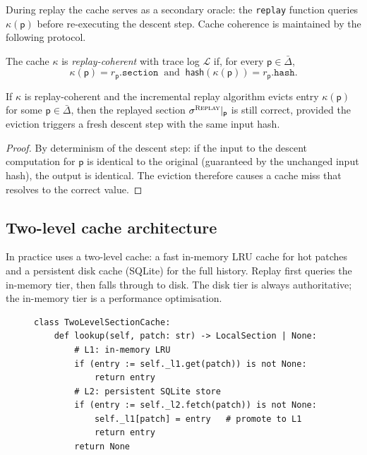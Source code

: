 \documentclass[11pt]{article}
\newcommand{\Replay}{\textsc{Replay}}
\newcommand{\TraceLog}{\mathcal{L}}
\newcommand{\Patch}{\mathsf{p}}
\newcommand{\CacheFn}{\kappa}
\newcommand{\GS}{\sigma}                   %
\newcommand{\HashFn}{\mathsf{hash}}
\newcommand{\UnchangedSet}{\bar\Delta}
\begin{document}
During replay the cache serves as a secondary oracle: the \texttt{replay}
function queries $\CacheFn(\Patch)$ before re-executing the descent step.
Cache coherence is maintained by the following protocol.

\begin{definition}
\label{def:cache-coherence}
The cache $\CacheFn$ is \emph{replay-coherent} with trace log
$\TraceLog$ if, for every $\Patch \in \UnchangedSet$,
\[
  \CacheFn(\Patch) = r_\Patch.\mathtt{section}
  \;\;\text{and}\;\;
  \HashFn(\CacheFn(\Patch)) = r_\Patch.\mathtt{hash}.
\]
\end{definition}

\begin{lemma}
\label{lem:cache-evict}
If $\CacheFn$ is replay-coherent and the incremental replay algorithm
evicts entry $\CacheFn(\Patch)$ for some $\Patch \in \UnchangedSet$,
then the replayed section $\GS^{\Replay}|_\Patch$ is still correct,
provided the eviction triggers a fresh descent step with the same input
hash.
\end{lemma}

\begin{proof}
By determinism of the descent step: if the input to the descent
computation for $\Patch$ is identical to the original (guaranteed by
the unchanged input hash), the output is identical.  The eviction
therefore causes a cache miss that resolves to the correct value.
\end{proof}

\subsection{Two-level cache architecture}

In practice \JuGeo uses a two-level cache: a fast in-memory LRU cache
for hot patches and a persistent disk cache (SQLite) for the full
history.  Replay first queries the in-memory tier, then falls through to
disk.  The disk tier is always authoritative; the in-memory tier is a
performance optimisation.

\begin{figure}[htbp]
\begin{lstlisting}[style=jugeo-python, caption={Two-level cache lookup
  during replay.}]
class TwoLevelSectionCache:
    def lookup(self, patch: str) -> LocalSection | None:
        # L1: in-memory LRU
        if (entry := self._l1.get(patch)) is not None:
            return entry
        # L2: persistent SQLite store
        if (entry := self._l2.fetch(patch)) is not None:
            self._l1[patch] = entry   # promote to L1
            return entry
        return None
\end{lstlisting}
\end{figure}
\end{document}
